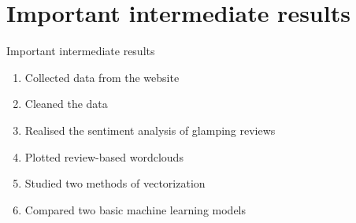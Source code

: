 \section{Important intermediate results}
\begin{frame}{Important intermediate results}
\begin{enumerate}
    \item Collected data from the website
    \item Cleaned the data
    \item Realised the sentiment analysis of glamping reviews
    \item Plotted review-based wordclouds
    \item Studied two methods of vectorization
    \item Compared two basic machine learning models
\end{enumerate}
\end{frame}